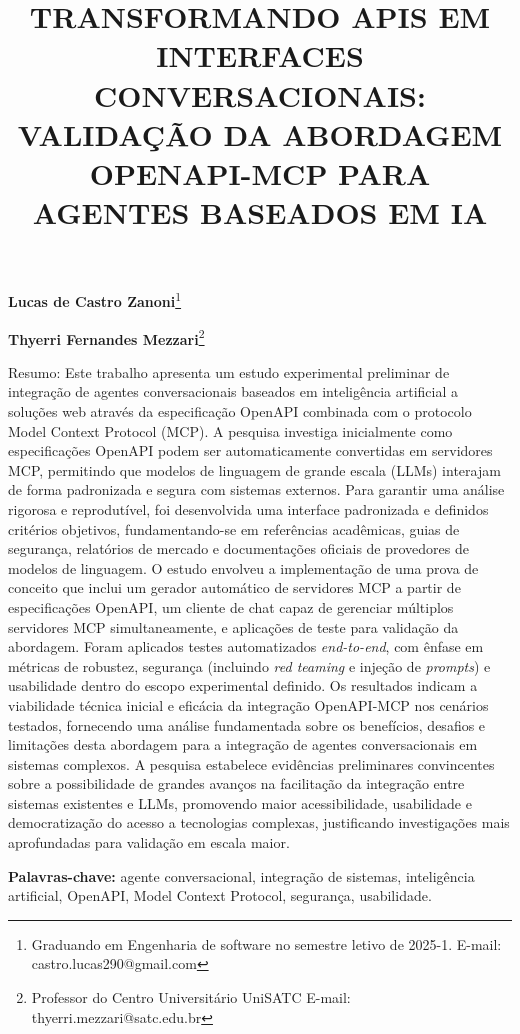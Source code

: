 \documentclass[
]{article}
\title{\textbf{TRANSFORMANDO APIS EM INTERFACES CONVERSACIONAIS:
VALIDAÇÃO DA ABORDAGEM OPENAPI-MCP PARA AGENTES BASEADOS EM IA}}
\author{}
\date{}
\begin{document}
\maketitle

\textbf{Lucas de Castro Zanoni}\footnote{Graduando em Engenharia de
  software no semestre letivo de 2025-1. E-mail:
  castro.lucas290@gmail.com}

\textbf{Thyerri Fernandes Mezzari}\footnote{Professor do Centro
  Universitário UniSATC E-mail: thyerri.mezzari@satc.edu.br}

Resumo: Este trabalho apresenta um estudo experimental preliminar de
integração de agentes conversacionais baseados em inteligência
artificial a soluções web através da especificação OpenAPI combinada com
o protocolo Model Context Protocol (MCP). A pesquisa investiga
inicialmente como especificações OpenAPI podem ser automaticamente
convertidas em servidores MCP, permitindo que modelos de linguagem de
grande escala (LLMs) interajam de forma padronizada e segura com
sistemas externos. Para garantir uma análise rigorosa e reprodutível,
foi desenvolvida uma interface padronizada e definidos critérios
objetivos, fundamentando-se em referências acadêmicas, guias de
segurança, relatórios de mercado e documentações oficiais de provedores
de modelos de linguagem. O estudo envolveu a implementação de uma prova
de conceito que inclui um gerador automático de servidores MCP a partir
de especificações OpenAPI, um cliente de chat capaz de gerenciar
múltiplos servidores MCP simultaneamente, e aplicações de teste para
validação da abordagem. Foram aplicados testes automatizados
\emph{end-to-end}, com ênfase em métricas de robustez, segurança
(incluindo \emph{red teaming} e injeção de \emph{prompts}) e usabilidade
dentro do escopo experimental definido. Os resultados indicam a
viabilidade técnica inicial e eficácia da integração OpenAPI-MCP nos
cenários testados, fornecendo uma análise fundamentada sobre os
benefícios, desafios e limitações desta abordagem para a integração de
agentes conversacionais em sistemas complexos. A pesquisa estabelece
evidências preliminares convincentes sobre a possibilidade de grandes
avanços na facilitação da integração entre sistemas existentes e LLMs,
promovendo maior acessibilidade, usabilidade e democratização do acesso
a tecnologias complexas, justificando investigações mais aprofundadas
para validação em escala maior.

\textbf{Palavras-chave:} agente conversacional, integração de sistemas,
inteligência artificial, OpenAPI, Model Context Protocol, segurança,
usabilidade.
\end{document}
